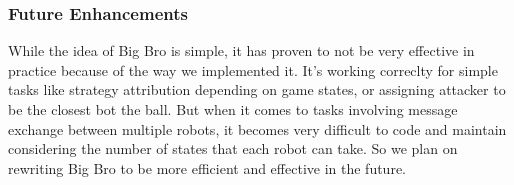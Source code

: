 \subsubsection{Future Enhancements}

While the idea of Big Bro is simple, it has proven to not be very effective in practice because of the way we implemented it. 
It's working correclty for simple tasks like strategy attribution depending on game states, or assigning attacker to be the closest bot the ball. But when it comes to tasks involving message exchange between multiple robots, it becomes very difficult to code and maintain considering the number of states that each robot can take.
So we plan on rewriting Big Bro to be more efficient and effective in the future.